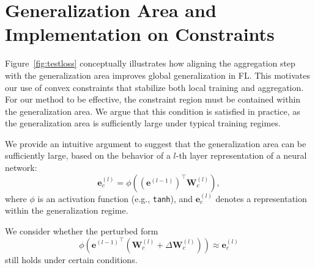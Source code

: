 \documentclass{article}
\theoremstyle{plain}
\theoremstyle{definition}
\theoremstyle{remark}
\begin{document}





\newpage
\appendix
\onecolumn
%
\section{Generalization Area and Implementation on Constraints}

Figure~\ref{fig:testloss} conceptually illustrates how aligning the aggregation step with the generalization area improves global generalization in FL. This motivates our use of convex constraints that stabilize both local training and aggregation. For our method to be effective, the constraint region must be contained within the generalization area. We argue that this condition is satisfied in practice, as the generalization area is sufficiently large under typical training regimes.

We provide an intuitive argument to suggest that the generalization area can be sufficiently large, based on the behavior of a $l$-th layer representation of a neural network:
\begin{equation}
    \mathbf{e}_c^{(l)} = \phi \left( (\mathbf{e}^{(l-1)})^{\top} \mathbf{W}_c^{(l)} \right),
\end{equation}
where $\phi$ is an activation function (e.g., \texttt{tanh}), and $\mathbf{e}_c^{(l)}$ denotes a representation within the generalization regime.

We consider whether the perturbed form
\begin{equation}
    \phi \left( {\mathbf{e}^{(l-1)}}^{\top} (\mathbf{W}_c^{(l)} + \Delta \mathbf{W}_c^{(l)})   \right) \approx \mathbf{e}_c^{(l)}
\end{equation}
still holds under certain conditions.
\end{document}

